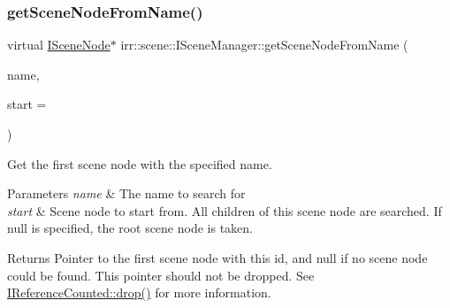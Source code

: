 \subsubsection{\texorpdfstring{get\+Scene\+Node\+From\+Name()}{getSceneNodeFromName()}\hspace{0.1cm}{\footnotesize\ttfamily [1/2]}}
{\footnotesize\ttfamily virtual \hyperlink{classirr_1_1scene_1_1ISceneNode}{I\+Scene\+Node}$\ast$ irr\+::scene\+::\+I\+Scene\+Manager\+::get\+Scene\+Node\+From\+Name (\begin{DoxyParamCaption}\item[{const \hyperlink{namespaceirr_a9395eaea339bcb546b319e9c96bf7410}{c8} $\ast$}]{name,  }\item[{\hyperlink{classirr_1_1scene_1_1ISceneNode}{I\+Scene\+Node} $\ast$}]{start = {} }\end{DoxyParamCaption})\hspace{0.3cm}{\ttfamily [pure virtual]}}



Get the first scene node with the specified name. 


\begin{DoxyParams}{Parameters}
{\em name} & The name to search for \\
\hline
{\em start} & Scene node to start from. All children of this scene node are searched. If null is specified, the root scene node is taken. \\
\hline
\end{DoxyParams}
\begin{DoxyReturn}{Returns}
Pointer to the first scene node with this id, and null if no scene node could be found. This pointer should not be dropped. See \hyperlink{classirr_1_1IReferenceCounted_a03856a09355b89d178090c4a5f738543}{I\+Reference\+Counted\+::drop()} for more information. 
\end{DoxyReturn}
\mbox{\label{classirr_1_1scene_1_1ISceneManager_a13ada3cca4b9eadee5e8ba3ccb6683da}} 
